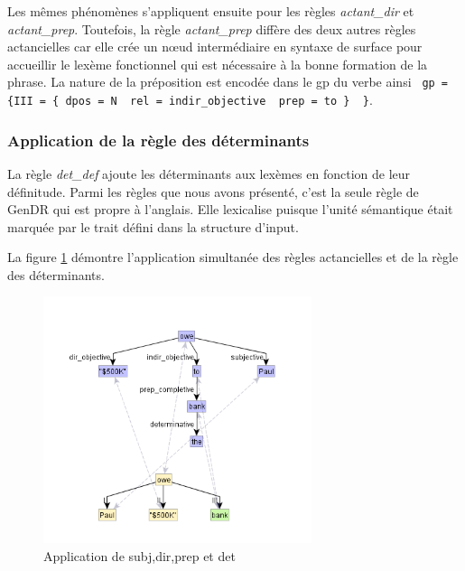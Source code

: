 Les mêmes phénomènes s'appliquent ensuite pour les règles \emph{actant\_dir} et \emph{actant\_prep}. Toutefois, la règle \emph{actant\_prep} diffère des deux autres règles actancielles car elle crée un n\oe{}ud intermédiaire en syntaxe de surface pour accueillir le lexème fonctionnel  qui est nécessaire à la bonne formation de la phrase. La nature de la préposition est encodée dans le gp du verbe ainsi \lstinline! gp = {III = { dpos = N  rel = indir_objective  prep = to }  }!.

\subsubsection{Application de la règle des déterminants}

La règle \emph{det\_def} ajoute les déterminants aux lexèmes en fonction de leur définitude. Parmi les règles que nous avons présenté, c'est la seule règle de GenDR qui est propre à l'anglais. Elle lexicalise  puisque l'unité sémantique  était marquée par le trait défini dans la structure d'input.

La figure \ref{fig:syntsurf} démontre l'application simultanée des règles actancielles et de la règle des déterminants.

\begin{figure}[htb]
	\centering
	\includegraphics[width=0.7\textwidth, trim = {0cm 8mm 0cm 15mm},clip]{ch3/figs/rsynts_syntactisation.png}
	\caption{Application de subj,dir,prep et det}
	\label{fig:syntsurf}
\end{figure}


